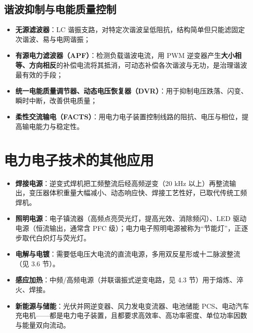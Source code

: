 \subsection{谐波抑制与电能质量控制}

\begin{itemize}
  \item \textbf{无源滤波器}：LC 谐振支路，对特定次谐波呈低阻抗，结构简单但只能滤固定次谐波、易与电网谐振；
  \item \textbf{有源电力滤波器（APF）}：检测负载谐波电流，用 PWM 逆变器产生\textbf{大小相等、方向相反}的补偿电流将其抵消，可动态补偿各次谐波与无功，是治理谐波最有效的手段；
  \item \textbf{统一电能质量调节器、动态电压恢复器（DVR）}：用于抑制电压跌落、闪变、瞬时中断，改善供电质量；
  \item \textbf{柔性交流输电（FACTS）}：用电力电子装置控制线路的阻抗、电压与相位，提高输电能力与稳定性。
\end{itemize}

\section{电力电子技术的其他应用}

\begin{itemize}
  \item \textbf{焊接电源}：逆变式焊机把工频整流后经高频逆变（20 kHz 以上）再整流输出，变压器体积重量大幅减小、动态响应快、焊接工艺性好，已取代传统工频焊机。
  \item \textbf{照明电源}：电子镇流器（高频点亮荧光灯，提高光效、消除频闪）、LED 驱动电源（恒流输出，通常含 PFC 级）；电力电子照明电源被称为“节能灯”，正逐步取代白炽灯与荧光灯。
  \item \textbf{电解与电镀}：需要低电压大电流的直流电源，多用双反星形或十二脉波整流（见 3.6 节）。
  \item \textbf{感应加热}：中频/高频电源（并联谐振式逆变电路，见 4.3 节）用于熔炼、淬火、焊接。
  \item \textbf{新能源与储能}：光伏并网逆变器、风力发电变流器、电池储能 PCS、电动汽车充电机——都是电力电子装置，且都要求高效率、高功率密度、单位功率因数与能量双向流动。
\end{itemize}

